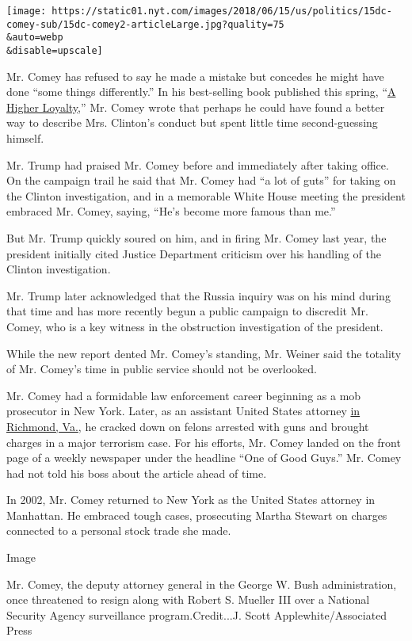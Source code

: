 \texttt{[image: https://static01.nyt.com/images/2018/06/15/us/politics/15dc-comey-sub/15dc-comey2-articleLarge.jpg?quality=75\\\&auto=webp\\\&disable=upscale]}

Mr. Comey has refused to say he made a mistake but concedes he might
have done ``some things differently.'' In his best-selling book
published this spring,
``\href{https://www.nytimes.com/2018/04/12/books/review/james-comey-a-higher-loyalty.html}{A
Higher Loyalty},'' Mr. Comey wrote that perhaps he could have found a
better way to describe Mrs. Clinton's conduct but spent little time
second-guessing himself.

Mr. Trump had praised Mr. Comey before and immediately after taking
office. On the campaign trail he said that Mr. Comey had ``a lot of
guts'' for taking on the Clinton investigation, and in a memorable White
House meeting the president embraced Mr. Comey, saying, ``He's become
more famous than me.''

But Mr. Trump quickly soured on him, and in firing Mr. Comey last year,
the president initially cited Justice Department criticism over his
handling of the Clinton investigation.

Mr. Trump later acknowledged that the Russia inquiry was on his mind
during that time and has more recently begun a public campaign to
discredit Mr. Comey, who is a key witness in the obstruction
investigation of the president.

While the new report dented Mr. Comey's standing, Mr. Weiner said the
totality of Mr. Comey's time in public service should not be overlooked.

Mr. Comey had a formidable law enforcement career beginning as a mob
prosecutor in New York. Later, as an assistant United States attorney
\href{https://www.nytimes.com/2001/12/02/nyregion/man-in-the-news-reputation-for-tenacity-james-brien-comey.html}{in
Richmond, Va.}, he cracked down on felons arrested with guns and brought
charges in a major terrorism case. For his efforts, Mr. Comey landed on
the front page of a weekly newspaper under the headline ``One of Good
Guys.'' Mr. Comey had not told his boss about the article ahead of time.

In 2002, Mr. Comey returned to New York as the United States attorney in
Manhattan. He embraced tough cases, prosecuting Martha Stewart on
charges connected to a personal stock trade she made.

Image

Mr. Comey, the deputy attorney general in the George W. Bush
administration, once threatened to resign along with Robert S. Mueller
III over a National Security Agency surveillance program.Credit...J.
Scott Applewhite/Associated Press

